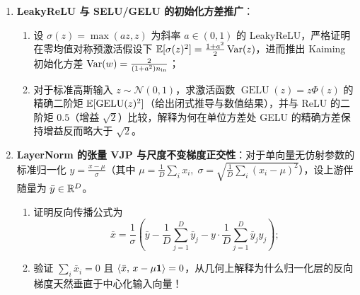 \begin{enumerate}
  \item[\textbf{5.2.3}] \textbf{LeakyReLU 与 SELU/GELU 的初始化方差推广}：
  \begin{enumerate}
    \item 设 $\sigma(z) = \max(a z, z)$ 为斜率 $a \in (0, 1)$ 的 LeakyReLU，严格证明在零均值对称预激活假设下 $\mathbb{E}[\sigma(z)^2] = \frac{1 + a^2}{2}\operatorname{Var}(z)$，进而推出 Kaiming 初始化方差 $\operatorname{Var}(w) = \frac{2}{(1+a^2)n_{\text{in}}}$；
    \item 对于标准高斯输入 $z \sim \mathcal{N}(0, 1)$，求激活函数 $\operatorname{GELU}(z) = z \Phi(z)$ 的精确二阶矩 $\mathbb{E}[\operatorname{GELU}(z)^2]$（给出闭式推导与数值结果），并与 ReLU 的二阶矩 $0.5$（增益 $\sqrt{2}$）比较，解释为何在单位方差处 GELU 的精确方差保持增益反而略大于 $\sqrt{2}$。
  \end{enumerate}

  \item[\textbf{5.2.4}] \textbf{LayerNorm 的张量 VJP 与尺度不变梯度正交性}：对于单向量无仿射参数的标准归一化 $y = \frac{x - \mu}{\sigma}$（其中 $\mu = \frac{1}{D}\sum_i x_i,\; \sigma = \sqrt{\frac{1}{D}\sum_i (x_i-\mu)^2}$），设上游伴随量为 $\bar{y} \in \mathbb{R}^D$。
  \begin{enumerate}
    \item 证明反向传播公式为
    \[
      \bar{x} = \frac{1}{\sigma}\left(\bar{y} - \frac{1}{D}\sum_{j=1}^D \bar{y}_j - y \cdot \frac{1}{D}\sum_{j=1}^D \bar{y}_j y_j\right);
    \]
    \item 验证 $\sum_i \bar{x}_i = 0$ 且 $\left\langle \bar{x},\, x - \mu\mathbf{1} \right\rangle = 0$，从几何上解释为什么归一化层的反向梯度天然垂直于中心化输入向量！
  \end{enumerate}
\end{enumerate}


